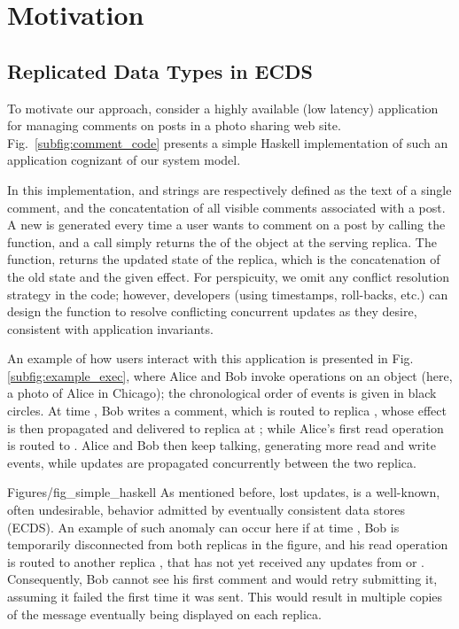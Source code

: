 \section{Motivation}
\label {sec:motiv}
\subsection{Replicated Data Types in ECDS }

To motivate our approach, consider a highly available (low
latency) application for managing comments on posts in 
a photo sharing web site.  Fig.~\ref{subfig:comment_code}
presents a simple Haskell implementation of such an application
cognizant of our system model.  

In this implementation, \effectC{} and \stateC{} strings are
respectively defined as the text of a single comment, and the
concatentation of all visible comments associated with a post.  A new
\effectC{} is generated every time a user wants to comment on a post
by calling the \writeC{} function, and a \readC{} call simply returns
the \stateC{} of the object at the serving replica.  The \applyC{}
function, returns the updated state of the replica, which is the
concatenation of the old state and the given effect.  For perspicuity,
we omit any conflict resolution strategy in the code; however,
developers (using timestamps, roll-backs, etc.) can design the
\applyC{} function to resolve conflicting concurrent updates as they
desire, consistent with application invariants.

An example of how users interact with this application is presented in
Fig.\ref{subfig:example_exec}, where Alice and Bob invoke operations
on an object (here, a photo of Alice in Chicago); the chronological
order of events is given in black circles.  At time , Bob
writes a comment, which is routed to replica , whose effect
is then propagated and delivered to replica  at ;
while Alice's first read operation is routed to .  Alice and
Bob then keep talking, generating more read and write events, while
updates are propagated concurrently between the two replica.

 {Figures/fig_simple_haskell}
As mentioned before, lost updates, is a well-known, often undesirable,
behavior admitted by eventually consistent data stores (ECDS).  An
example of such anomaly can occur here if at time , Bob is
temporarily disconnected from both replicas in the figure, and his
read operation is routed to another replica , that has not
yet received any updates from  or . Consequently,
Bob cannot see his first comment and would retry submitting it,
assuming it failed the first time it was sent.  This would result in
multiple copies of the message eventually being displayed on each
replica.


